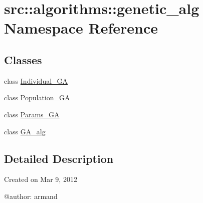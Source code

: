 \hypertarget{namespacesrc_1_1algorithms_1_1genetic__alg}{
\section{src::algorithms::genetic\_\-alg Namespace Reference}
\label{namespacesrc_1_1algorithms_1_1genetic__alg}
}
\subsection*{Classes}
\begin{DoxyCompactItemize}
\item 
class \hyperlink{classsrc_1_1algorithms_1_1genetic__alg_1_1Individual__GA}{Individual\_\-GA}
\item 
class \hyperlink{classsrc_1_1algorithms_1_1genetic__alg_1_1Population__GA}{Population\_\-GA}
\item 
class \hyperlink{classsrc_1_1algorithms_1_1genetic__alg_1_1Params__GA}{Params\_\-GA}
\item 
class \hyperlink{classsrc_1_1algorithms_1_1genetic__alg_1_1GA__alg}{GA\_\-alg}
\end{DoxyCompactItemize}


\subsection{Detailed Description}
\begin{DoxyVerb}
Created on Mar 9, 2012

@author: armand
\end{DoxyVerb}
 